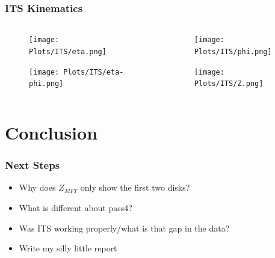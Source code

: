 \documentclass[11pt]{beamer}
\begin{document}
\begin{frame}
    \frametitle{ITS Kinematics}

    \begin{columns}[c]
        \begin{column}{0.5\textwidth}
            \begin{figure}
                \begin{center}
                    \texttt{[image: Plots/ITS/eta.png]}
                \end{center}
            \end{figure}
            \begin{figure}
                \begin{center}
                    \texttt{[image: Plots/ITS/eta-phi.png]}
                \end{center}
            \end{figure}
        \end{column}

        \begin{column}{0.5\textwidth}
            \begin{figure}
                \begin{center}
                    \texttt{[image: Plots/ITS/phi.png]}
                \end{center}
            \end{figure}
            \begin{figure}
                \begin{center}
                    \texttt{[image: Plots/ITS/Z.png]}
                \end{center}
            \end{figure}
        \end{column}
    \end{columns}

\end{frame}

\section{Conclusion}

\begin{frame}
    \frametitle{Next Steps}

    \begin{itemize}
        \item Why does $Z_{MFT}$ only show the first two disks?
        \item What is different about pass4?
        \item Was ITS working properly/what is that gap in the data?
        \item Write my silly little report
    \end{itemize}

\end{frame}
\end{document}
